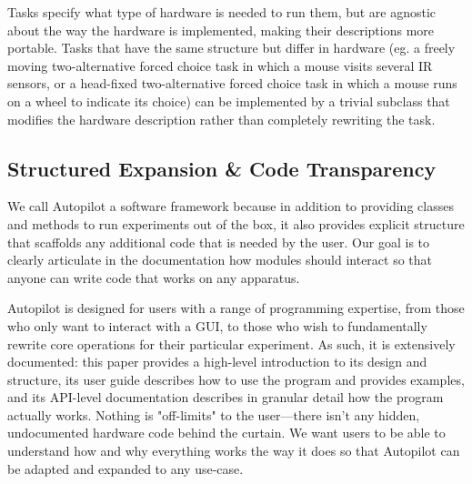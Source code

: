 Tasks specify what type of hardware is needed to run them, but are agnostic about the way the hardware is implemented, making their descriptions more portable. Tasks that have the same structure but differ in hardware (eg. a freely moving two-alternative forced choice task in which a mouse visits several IR sensors, or a head-fixed two-alternative forced choice task in which a mouse runs on a wheel to indicate its choice) can be implemented by a trivial subclass that modifies  the hardware description rather than completely rewriting the task.

\subsection{Structured Expansion \& Code Transparency}
\label{sec:expansion}

We call Autopilot a software framework because in addition to providing classes and methods to run experiments out of the box, it also provides explicit structure that scaffolds any additional code that is needed by the user. Our goal is to clearly articulate in the documentation how modules should interact so that anyone can write code that works on any apparatus. 

Autopilot is designed for users with a range of programming expertise, from those who only want to interact with a GUI, to those who wish to fundamentally rewrite core operations for their particular experiment. As such, it is extensively documented: this paper provides a high-level introduction to its design and structure, its user guide describes how to use the program and provides examples, and its API-level documentation describes in granular detail how the program actually works. Nothing is "off-limits" to the user---there isn't any hidden, undocumented hardware code behind the curtain. We want users to be able to understand how and why everything works the way it does so that Autopilot can be adapted and expanded to any use-case.

